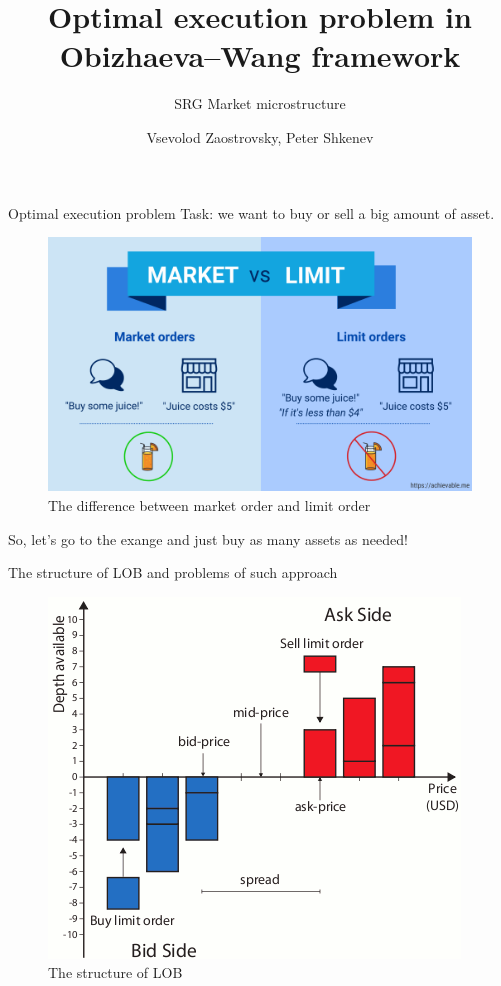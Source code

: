 \documentclass[aspectratio=169]{beamer}
\title{Optimal execution problem in Obizhaeva--Wang framework}
\subtitle{SRG Market microstructure}
\author{Vsevolod Zaostrovsky, Peter Shkenev}
\institute{Vega Institute Foundation}
\begin{document}
\maketitle

\begin{frame}{Optimal execution problem}
    Task: we want to buy or sell a big amount of asset. \par
    \begin{figure}
        \includegraphics[scale=0.23]{figs/market-vs-limit-1024x614.png}
        \caption{The difference between market order and limit order}
        \label{fig:mvslim}
    \end{figure}
    So, let's go to the exange and just buy as many assets as needed!

\end{frame}

\begin{frame}{The structure of LOB and problems of such approach}
    \begin{figure}
        \includegraphics[scale=0.45]{figs/Graphical-representation-of-the-Limit-Order-Book.png}
        \caption{The structure of LOB}
        \label{fig:mvslim}
    \end{figure}

\end{frame}
\end{document}
